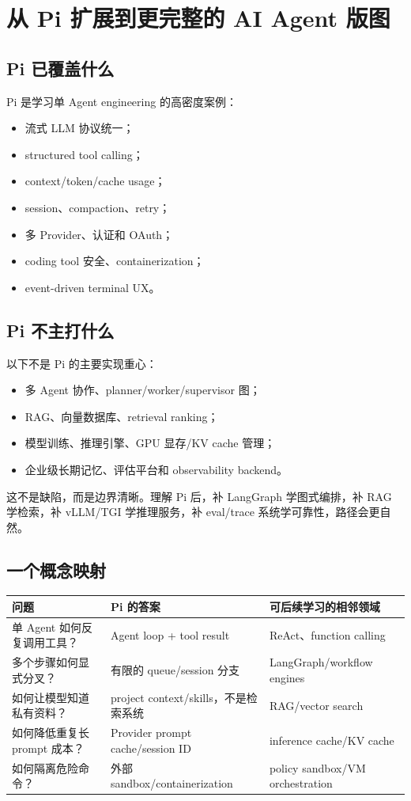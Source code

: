 \documentclass[UTF8,openany,11pt]{ctexbook}
\begin{document}
\chapter{从 Pi 扩展到更完整的 AI Agent 版图}

\section{Pi 已覆盖什么}
Pi 是学习单 Agent engineering 的高密度案例：
\begin{itemize}
\item 流式 LLM 协议统一；
\item structured tool calling；
\item context/token/cache usage；
\item session、compaction、retry；
\item 多 Provider、认证和 OAuth；
\item coding tool 安全、containerization；
\item event-driven terminal UX。
\end{itemize}

\section{Pi 不主打什么}
以下不是 Pi 的主要实现重心：
\begin{itemize}
\item 多 Agent 协作、planner/worker/supervisor 图；
\item RAG、向量数据库、retrieval ranking；
\item 模型训练、推理引擎、GPU 显存/KV cache 管理；
\item 企业级长期记忆、评估平台和 observability backend。
\end{itemize}
这不是缺陷，而是边界清晰。理解 Pi 后，补 LangGraph 学图式编排，补 RAG 学检索，补 vLLM/TGI 学推理服务，补 eval/trace 系统学可靠性，路径会更自然。

\section{一个概念映射}
\begin{longtable}{p{}p{}p{}}
\toprule
问题 & Pi 的答案 & 可后续学习的相邻领域\\
\midrule
单 Agent 如何反复调用工具？ & Agent loop + tool result & ReAct、function calling\\
多个步骤如何显式分叉？ & 有限的 queue/session 分支 & LangGraph/workflow engines\\
如何让模型知道私有资料？ & project context/skills，不是检索系统 & RAG/vector search\\
如何降低重复长 prompt 成本？ & Provider prompt cache/session ID & inference cache/KV cache\\
如何隔离危险命令？ & 外部 sandbox/containerization & policy sandbox/VM orchestration\\
\bottomrule
\end{longtable}
\end{document}

